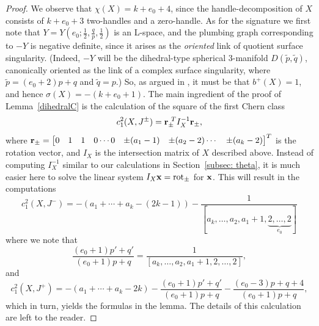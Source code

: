 \documentclass[11pt]{amsart}
\theoremstyle{plain}
\theoremstyle{definition}
\theoremstyle{remark}
\numberwithin{theorem}{section}
\DeclareMathOperator\rot{rot}                 %
\begin{document}
\begin{proof}
We observe that $\chi(X)=k+e_0+4$, since the handle-decomposition of $X$ consists of  $k+e_0+3$ two-handles and a zero-handle. As for the signature we first note that $Y=Y(e_0; \frac{1}{2},  \frac{q}{p}, \frac{1}{2})$  is an L-space, and the plumbing graph corresponding to $-Y$ is negative definite, since it arises as the {\em oriented} link of quotient surface singularity. (Indeed, $-Y$ will be the dihedral-type spherical $3$-manifold $D(\widetilde{p}, \widetilde{q})$, canonically oriented as the link of a complex surface singularity, where $\widetilde{p}=(e_0+2)p+q$ and $\widetilde{q}=p$.)
So, as argued in \cite[Section~8.1]{StipsiczSzaboWahl08}, it must be that $b^+(X)=1$, and hence $\sigma(X)=-(k+e_0+1)$. The main ingredient of the proof of Lemma~\ref{dihedralC} is the  calculation of the square of the first Chern class 
\begin{equation}\label{chern}
c^2_1(X, J^{\pm})={\bf r}_{\pm}^{~T} I_X^{-1} {\bf r}_{\pm}, 
\end{equation}
where ${\bf r}_{\pm}=\begin{bmatrix}
0 & 1&1& 0 \cdots 0&\pm (a_1-1)& \pm (a_2-2) \cdots  & \pm(a_k-2)
\end{bmatrix}^T$ is the rotation vector, and $I_X$ is the intersection matrix of $X$ described above. Instead of computing  $I_X^{-1}$ similar to our calculations in  Section~\ref{subsec: theta}, it is much easier here to solve the linear system $I_X{\bf x}=\rot_{\pm}$ for ${\bf x}$. This will result in the computations
\[
c_1^2(X, J^-)=-(a_1+\cdots +a_k-(2k-1)) -\dfrac{1}{[a_k, \ldots, a_2, a_1+1, \underbrace{2,\ldots, 2}_{e_0}]}
\]
\noindent where we note that $$\frac{(e_0+1)p'+q'}{(e_0+1)p+q}=\dfrac{1}{[a_k, \ldots, a_2, a_1+1, 2,\ldots, 2]},$$ and
\[
c_1^2(X,J^+)=-(a_1+\cdots+a_k-2k)-\frac{(e_0+1)p'+q'}{(e_0+1)p+q}-\frac{(e_0-3)p+q+4}{(e_0+1)p+q},
\]
which in turn, yields the formulas in the lemma. The details of this calculation are left to the reader. 
\end{proof} 
\end{document}
